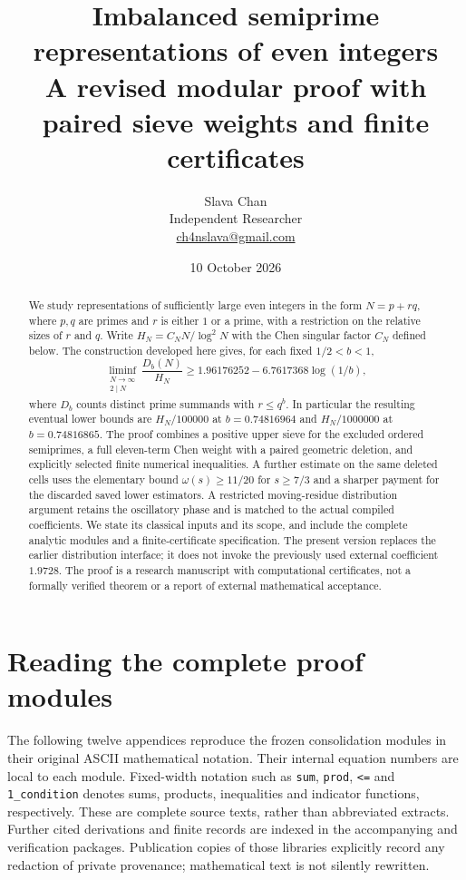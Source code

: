 \documentclass[11pt]{article}
\title{Imbalanced semiprime representations of even integers\\[3pt]
\large A revised modular proof with paired sieve weights and finite certificates}
\author{Slava Chan\\\small Independent Researcher\\\small\href{mailto:ch4nslava@gmail.com}{ch4nslava@gmail.com}}
\date{10 October 2026}
\begin{document}
\maketitle
\begin{abstract}
We study representations of sufficiently large even integers in the form
$N=p+rq$, where $p,q$ are primes and $r$ is either $1$ or a prime, with a
restriction on the relative sizes of $r$ and $q$.  Write
$H_N=C_NN/\log^2N$ with the Chen singular factor $C_N$ defined below.
The construction developed here gives, for each fixed $1/2<b<1$,
\[
 \liminf_{\substack{N\to\infty\\2\mid N}}
 \frac{D_b(N)}{H_N}
 \ge 1.96176252-6.7617368\log(1/b),
\]
where $D_b$ counts distinct prime summands with $r\le q^b$.
In particular the resulting eventual lower bounds are $H_N/100000$ at
$b=0.74816964$ and $H_N/1000000$ at $b=0.74816865$.
The proof combines a positive upper sieve for the excluded ordered
semiprimes, a full eleven-term Chen weight with a paired geometric
deletion, and explicitly selected finite numerical inequalities.  A
further estimate on the same deleted cells uses the elementary bound
$\omega(s)\ge11/20$ for $s\ge7/3$ and a sharper payment for the
discarded saved lower estimators.  A
restricted moving-residue distribution argument retains the oscillatory
phase and is matched to the actual compiled coefficients.  We state its
classical inputs and its scope, and include the complete analytic modules
and a finite-certificate specification.  The present version replaces the
earlier distribution interface; it does not invoke the previously used
external coefficient $1.9728$.  The proof is a research manuscript with
computational certificates, not a formally verified theorem or a report
of external mathematical acceptance.
\end{abstract}
\clearpage
\tableofcontents
\clearpage

\clearpage

\clearpage
\appendix
\section*{Reading the complete proof modules}
The following twelve appendices reproduce the frozen consolidation modules in
their original ASCII mathematical notation. Their internal equation numbers
are local to each module. Fixed-width notation such as \texttt{sum},
\texttt{prod}, \texttt{<=} and \texttt{1\_condition} denotes sums, products,
inequalities and indicator functions, respectively. These are complete source
texts, rather than abbreviated extracts. Further cited derivations and finite
records are indexed in the accompanying  and verification
packages. Publication copies of those libraries explicitly record any redaction
of private provenance; mathematical text is not silently rewritten.
\end{document}
